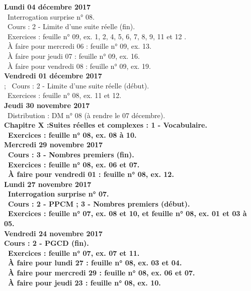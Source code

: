\documentclass[12pt,a4paper]{article}
\begin{document}
\noindent\textbf{Lundi 04 décembre 2017}\\
\bu\ Interrogation surprise n° 08.\\
\bu\ Cours : 2 - Limite d'une suite réelle (fin).\\
\bu\ Exercices : feuille n° 09, ex. 1, 2, 4, 5, 6, 7, 8, 9, 11 et 12 .\\
\bu\ À faire pour mercredi 06 : feuille n° 09, ex. 13.\\
\bu\ À faire pour jeudi 07 : feuille n° 09, ex. 16.\\
\bu\ À faire pour vendredi 08 : feuille n° 09, ex. 19.\vspace{.4cm}\\

\noindent\textbf{Vendredi 01 décembre 2017}\\ ; 
\bu\ Cours : 2 - Limite d'une suite réelle (début).\\
\bu\ Exercices : feuille n° 08, ex. 11 et 12.\vspace{.4cm}\\

\noindent\textbf{Jeudi 30 novembre 2017}\\
\bu\ Distribution : DM n° 08 (à rendre le 07 décembre).\\
\bf Chapitre X :\rm Suites réelles et complexes : 1 - Vocabulaire.\\
\bu\ Exercices : feuille n° 08, ex. 08 à 10.\vspace{.4cm}\\

\noindent\textbf{\bf Mercredi 29 novembre 2017}\\
\bu\ Cours : 3 - Nombres premiers (fin).\\
\bu\ Exercices : feuille n° 08, ex. 06 et 07.\\
\bu\ À faire pour vendredi 01 : feuille n° 08, ex. 12.\vspace{.4cm}\\

\noindent\textbf{Lundi 27 novembre 2017}\\
\bu\ Interrogation surprise n° 07.\\
\bu\ Cours : 2 - PPCM ; 3 - Nombres premiers (début).\\
\bu\ Exercices : feuille n° 07, ex. 08 et 10, et feuille n° 08, ex. 01 et 03 à 05.\vspace{.4cm}\\

\noindent\textbf{Vendredi 24 novembre 2017}\\
\bf Cours : 2 - PGCD (fin).\\
\bu\ Exercices : feuille n° 07, ex. 07 et 11.\\
\bu\ À faire pour lundi 27 : feuille n° 08, ex. 03 et 04.\\
\bu\ À faire pour mercredi 29 : feuille n° 08, ex. 06 et 07.\\
\bu\ À faire pour jeudi 23 : feuille n° 08, ex. 10.\vspace{.4cm}\\
\end{document}
